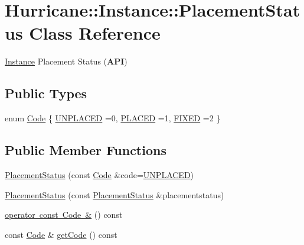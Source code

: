 \hypertarget{classHurricane_1_1Instance_1_1PlacementStatus}{}\section{Hurricane\+:\+:Instance\+:\+:Placement\+Status Class Reference}
\label{classHurricane_1_1Instance_1_1PlacementStatus}


\mbox{\hyperlink{classHurricane_1_1Instance}{Instance}} Placement Status ({\bfseries A\+PI})  


\subsection*{Public Types}
\begin{DoxyCompactItemize}
\item 
enum \mbox{\hyperlink{classHurricane_1_1Instance_1_1PlacementStatus_af76cc0838783b3eb3a515eb3c3e0f7bf}{Code}} \{ \newline
\mbox{\hyperlink{classHurricane_1_1Instance_1_1PlacementStatus_af76cc0838783b3eb3a515eb3c3e0f7bfa3e19a0a1b3e8c8fd860164df7f935216}{U\+N\+P\+L\+A\+C\+ED}} =0, 
\newline
\mbox{\hyperlink{classHurricane_1_1Instance_1_1PlacementStatus_af76cc0838783b3eb3a515eb3c3e0f7bfaf3589c11ecd7d5de63db24826b74d457}{P\+L\+A\+C\+ED}} =1, 
\newline
\mbox{\hyperlink{classHurricane_1_1Instance_1_1PlacementStatus_af76cc0838783b3eb3a515eb3c3e0f7bfa47be8a40f04081635fe24485ae7c6bd7}{F\+I\+X\+ED}} =2
 \}
\end{DoxyCompactItemize}
\subsection*{Public Member Functions}
\begin{DoxyCompactItemize}
\item 
\mbox{\hyperlink{classHurricane_1_1Instance_1_1PlacementStatus_a29d2678343f4b712a9bbbb8f5460ec11}{Placement\+Status}} (const \mbox{\hyperlink{classHurricane_1_1Instance_1_1PlacementStatus_af76cc0838783b3eb3a515eb3c3e0f7bf}{Code}} \&code=\mbox{\hyperlink{classHurricane_1_1Instance_1_1PlacementStatus_af76cc0838783b3eb3a515eb3c3e0f7bfa3e19a0a1b3e8c8fd860164df7f935216}{U\+N\+P\+L\+A\+C\+ED}})
\item 
\mbox{\hyperlink{classHurricane_1_1Instance_1_1PlacementStatus_a121a628ab6f7a86b99acacc0d874d97b}{Placement\+Status}} (const \mbox{\hyperlink{classHurricane_1_1Instance_1_1PlacementStatus}{Placement\+Status}} \&placementstatus)
\item 
\mbox{\hyperlink{classHurricane_1_1Instance_1_1PlacementStatus_a375d2547ed3e8a127e34b0ee3ca14ad6}{operator const Code \&}} () const
\item 
const \mbox{\hyperlink{classHurricane_1_1Instance_1_1PlacementStatus_af76cc0838783b3eb3a515eb3c3e0f7bf}{Code}} \& \mbox{\hyperlink{classHurricane_1_1Instance_1_1PlacementStatus_aa907067c594076ed8422bf6c949c8731}{get\+Code}} () const
\end{DoxyCompactItemize}


